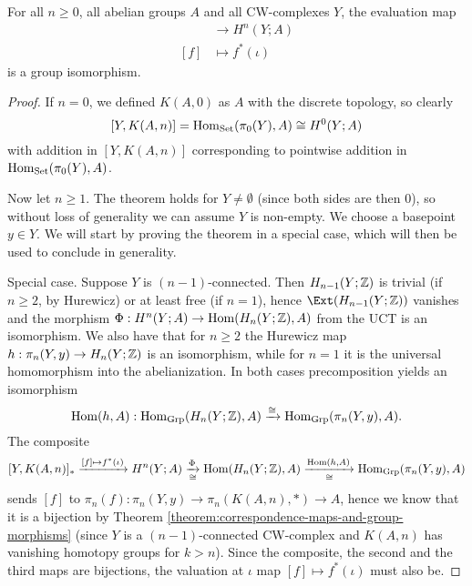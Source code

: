 \begin{theorem}
For all $n\ge0$, all abelian groups $A$ and all CW-complexes $Y$, the evaluation map
\begin{align*}
    [Y,K(A,n)]&\to H^n(Y;A)\\
    [f]&\mapsto f^*(\iota)
\end{align*}
is a group isomorphism.
\end{theorem}

\begin{proof}\renewcommand{\qedsymbol}{\textit{To be continued...}}
If $n=0$, we defined $K(A,0)$ as $A$ with the discrete topology, so clearly
\[[Y,K(A,n)]=\operatorname{Hom}_{\mathrm{Set}}(\pi_0(Y),A)\cong H^0(Y;A)\]
with addition in $[Y,K(A,n)]$ corresponding to pointwise addition in $\operatorname{Hom}_{\mathrm{Set}}(\pi_0(Y),A)$.

Now let $n\ge1$. The theorem holds for $Y\ne\emptyset$ (since both sides are then $0$), so without loss of generality we can assume $Y$ is non-empty. We choose a basepoint $y\in Y$. We will start by proving the theorem in a special case, which will then be used to conclude in generality.

Special case. Suppose $Y$ is $(n-1)$-connected. Then $H_{n-1}(Y;{\mathbb Z})$ is trivial (if $n\ge2$, by Hurewicz) or at least free (if $n=1$), hence $\Ext(H_\ni(Y;\Z))$ vanishes and the morphism $\Phi:H^n(Y;A)\to\operatorname{Hom}(H_n(Y;{\mathbb Z}),A)$ from the UCT is an isomorphism. We also have that for $n\ge2$ the Hurewicz map $h:\pi_n(Y,y)\to H_n(Y;{\mathbb Z})$ is an isomorphism, while for $n=1$ it is the universal homomorphism into the abelianization. In both cases precomposition yields an isomorphism
\[\operatorname{Hom}(h,A):\operatorname{Hom}_{\mathrm{Grp}}(H_n(Y;{\mathbb Z}),A)\xrightarrow{\cong}\operatorname{Hom}_{\mathrm{Grp}}(\pi_n(Y,y),A).\]
The composite
\[[Y,K(A,n)]_*\xrightarrow{[f]\mapsto f^*(\iota)} H^n(Y;A)\underset{\cong}{\xrightarrow{\Phi}}\operatorname{Hom}(H_n(Y;{\mathbb Z}),A)\underset{\cong}{\xrightarrow{\operatorname{Hom}(h,A)}}\operatorname{Hom}_{\mathrm{Grp}}(\pi_n(Y,y),A)\]
sends $[f]$ to $\pi_n(f):\pi_n(Y,y)\to\pi_n(K(A,n),*)\to A$, hence we know that it is a bijection by Theorem \ref{theorem:correspondence-maps-and-group-morphisms} (since $Y$ is a $(n-1)$-connected CW-complex and $K(A,n)$ has vanishing homotopy groups for $k>n$). Since the composite, the second and the third maps are bijections, the valuation at $\iota$ map $[f]\mapsto f^*(\iota)$ must also be.
\end{proof}
